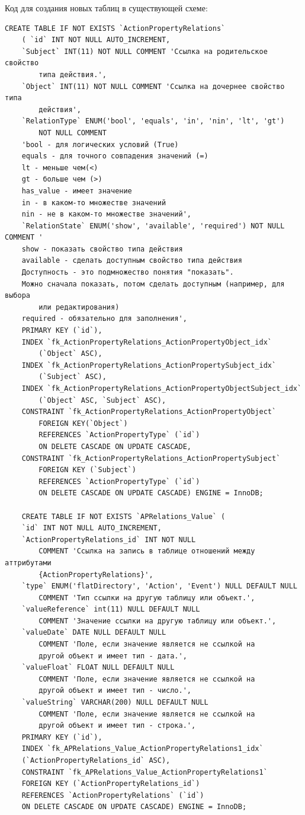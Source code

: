 \documentclass[a4paper,8pt]{report} %
\begin{document}
{    Код для создания новых таблиц в существующей схеме:
\begin{verbatim}
CREATE TABLE IF NOT EXISTS `ActionPropertyRelations`
    ( `id` INT NOT NULL AUTO_INCREMENT,
    `Subject` INT(11) NOT NULL COMMENT 'Ссылка на родительское свойство
        типа действия.',
    `Object` INT(11) NOT NULL COMMENT 'Ссылка на дочернее свойство типа
        действия',
    `RelationType` ENUM('bool', 'equals', 'in', 'nin', 'lt', 'gt')
        NOT NULL COMMENT
    'bool - для логических условий (True)
    equals - для точного совпадения значений (=)
    lt - меньше чем(<)
    gt - больше чем (>)
    has_value - имеет значение
    in - в каком-то множестве значений
    nin - не в каком-то множестве значений',
    `RelationState` ENUM('show', 'available', 'required') NOT NULL COMMENT '
    show - показать свойство типа действия
    available - сделать доступным свойство типа действия
    Доступность - это подмножество понятия "показать".
    Можно сначала показать, потом сделать доступным (например, для выбора
        или редактирования)
    required - обязательно для заполнения',
    PRIMARY KEY (`id`),
    INDEX `fk_ActionPropertyRelations_ActionPropertyObject_idx`
        (`Object` ASC),
    INDEX `fk_ActionPropertyRelations_ActionPropertySubject_idx`
        (`Subject` ASC),
    INDEX `fk_ActionPropertyRelations_ActionPropertyObjectSubject_idx`
        (`Object` ASC, `Subject` ASC),
    CONSTRAINT `fk_ActionPropertyRelations_ActionPropertyObject`
        FOREIGN KEY(`Object`)
        REFERENCES `ActionPropertyType` (`id`)
        ON DELETE CASCADE ON UPDATE CASCADE,
    CONSTRAINT `fk_ActionPropertyRelations_ActionPropertySubject`
        FOREIGN KEY (`Subject`)
        REFERENCES `ActionPropertyType` (`id`)
        ON DELETE CASCADE ON UPDATE CASCADE) ENGINE = InnoDB;

    CREATE TABLE IF NOT EXISTS `APRelations_Value` (
    `id` INT NOT NULL AUTO_INCREMENT,
    `ActionPropertyRelations_id` INT NOT NULL
        COMMENT 'Ссылка на запись в таблице отношений между аттрибутами
        {ActionPropertyRelations}',
    `type` ENUM('flatDirectory', 'Action', 'Event') NULL DEFAULT NULL
        COMMENT 'Тип ссылки на другую таблицу или объект.',
    `valueReference` int(11) NULL DEFAULT NULL
        COMMENT 'Значение ссылки на другую таблицу или объект.',
    `valueDate` DATE NULL DEFAULT NULL
        COMMENT 'Поле, если значение является не ссылкой на
        другой объект и имеет тип - дата.',
    `valueFloat` FLOAT NULL DEFAULT NULL
        COMMENT 'Поле, если значение является не ссылкой на
        другой объект и имеет тип - число.',
    `valueString` VARCHAR(200) NULL DEFAULT NULL
        COMMENT 'Поле, если значение является не ссылкой на
        другой объект и имеет тип - строка.',
    PRIMARY KEY (`id`),
    INDEX `fk_APRelations_Value_ActionPropertyRelations1_idx`
    (`ActionPropertyRelations_id` ASC),
    CONSTRAINT `fk_APRelations_Value_ActionPropertyRelations1`
    FOREIGN KEY (`ActionPropertyRelations_id`)
    REFERENCES `ActionPropertyRelations` (`id`)
    ON DELETE CASCADE ON UPDATE CASCADE) ENGINE = InnoDB;
\end{verbatim}

}
\end{document}
